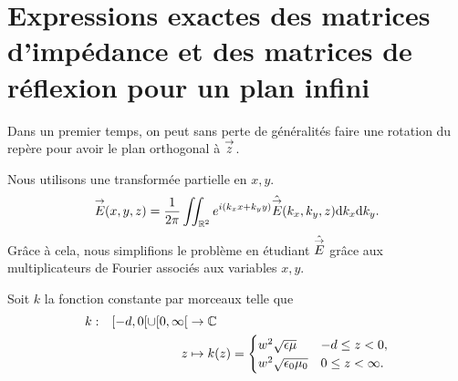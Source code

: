 \section[Opérateur de Calderón pour un plan]{Expressions exactes des matrices d'impédance et des matrices de réflexion pour un plan infini}

    Dans un premier temps, on peut sans perte de généralités faire une rotation du repère pour avoir le plan orthogonal à \(\vect{z}\).
    \begin{figure}[!h]
        \begin{center}
            \begin{tikzpicture}
                
            \end{tikzpicture}
        \end{center}
    \end{figure}
    Nous utilisons une transformée partielle en \(x, y\).
    \begin{equation*}
        \vE(x,y,z) = \frac{1}{2\pi}\iint_{\RR^2} e^{i(k_x x + k_y y)}\hat{\vE} (k_x,k_y,z) \dd{k_x}\dd{k_y.}
    \end{equation*}
    Grâce à cela, nous simplifions le problème en étudiant \( \hat{\vE}\) grâce aux multiplicateurs de Fourier associés aux variables \(x,y\). 

    Soit \(k\) la fonction constante par morceaux telle que
    \begin{equation*}
    \fonction{k}{[-d,0[\cup[0,\infty[}{\CC}
          {z}{k(z)=
          \begin{cases} 
            w^2\sqrt{\eps\mu} & -d \le z < 0,
            \\
            w^2\sqrt{\eps_0\mu_0} & 0 \le z < \infty.
          \end{cases}}
    \end{equation*}

